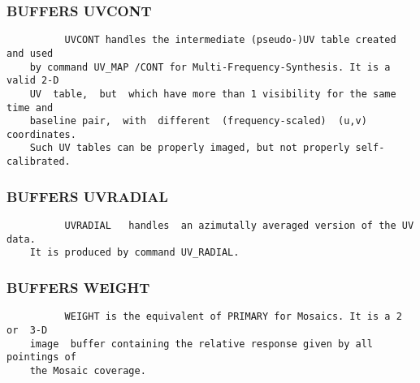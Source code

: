 \subsubsection{BUFFERS UVCONT}
\begin{verbatim}
          UVCONT handles the intermediate (pseudo-)UV table created and used
    by command UV_MAP /CONT for Multi-Frequency-Synthesis. It is a valid 2-D
    UV  table,  but  which have more than 1 visibility for the same time and
    baseline pair,  with  different  (frequency-scaled)  (u,v)  coordinates.
    Such UV tables can be properly imaged, but not properly self-calibrated.

\end{verbatim}
\subsubsection{BUFFERS UVRADIAL}
\begin{verbatim}
          UVRADIAL   handles  an azimutally averaged version of the UV data.
    It is produced by command UV_RADIAL.

\end{verbatim}
\subsubsection{BUFFERS WEIGHT}
\begin{verbatim}
          WEIGHT is the equivalent of PRIMARY for Mosaics. It is a 2 or  3-D
    image  buffer containing the relative response given by all pointings of
    the Mosaic coverage.


\end{verbatim}

